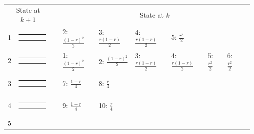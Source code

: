 \documentclass[9pt,letterpaper,twoside]{article}
\begin{document}
\bigskip

{
\begin{center}
\begin{tabular}{ccclllllll} \hline
\multicolumn{2}{c}{State at $k+1$} & &
\multicolumn{7}{c}{State at $k$} \\
\cline{1-2} \cline{4-10}
1 &
{\renewcommand{\arraystretch}{0.3}
\renewcommand{\tabcolsep}{0.5mm}
\parbox[b][3mm][c]{12mm}{
\begin{tabular}{|p{2mm}|p{2mm}||p{2mm}|p{2mm}|} \hline
$\bullet$ & $\circ  $ &           &           \\
$\bullet$ & $\circ  $ &           &           \\ \hline
\end{tabular}}}
&
& 2: $\frac{(1-r)^2}{2}$
& 3: $\frac{r(1-r)}{2}$
& 4: $\frac{r(1-r)}{2}$
& 5: $\frac{r^2}{2}$
& & & \\
2 &
{\renewcommand{\arraystretch}{0.3}
\renewcommand{\tabcolsep}{0.5mm}
\parbox[b][3mm][c]{12mm}{
\begin{tabular}{|p{2mm}|p{2mm}||p{2mm}|p{2mm}|} \hline
$\bullet$ &           & $\circ  $ &           \\
$\bullet$ &           & $\circ  $ &           \\ \hline
\end{tabular}}}
&
& 1: $\frac{(1-r)^2}{2}$
& 2: $\frac{(1-r)^2}{2}$
& 3: $\frac{r(1-r)}{2}$
& 4: $\frac{r(1-r)}{2}$
& 5: $\frac{r^2}{2}$
& 6: $\frac{r^2}{2}$
& \\
3 &
{\renewcommand{\arraystretch}{0.3}
\renewcommand{\tabcolsep}{0.5mm}
\parbox[b][3mm][c]{12mm}{
\begin{tabular}{|p{2mm}|p{2mm}||p{2mm}|p{2mm}|} \hline
$\bullet$ &           & $\circ  $ &           \\
$\bullet$ &           &           & $\circ  $ \\ \hline
\end{tabular}}}
&
& 7: $\frac{1-r}{4}$
& 8: $\frac{r}{4}$
& & & & & \\
4 &
{\renewcommand{\arraystretch}{0.3}
\renewcommand{\tabcolsep}{0.5mm}
\parbox[b][3mm][c]{12mm}{
\begin{tabular}{|p{2mm}|p{2mm}||p{2mm}|p{2mm}|} \hline
$\bullet$ &           & $\circ  $ &           \\
          & $\bullet$ & $\circ  $ &           \\ \hline
\end{tabular}}}
&
& 9: $\frac{1-r}{4}$
& 10: $\frac{r}{4}$
& & & & & \\
5 &

\end{tabular}
\end{center}}
\end{document}
